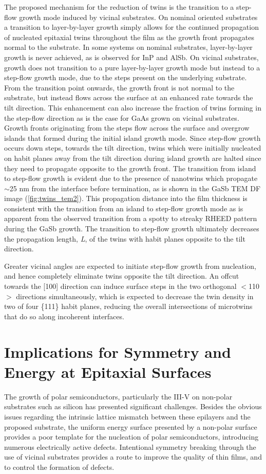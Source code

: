 The proposed mechanism for the reduction of twins is the transition to a step-flow growth mode induced by vicinal substrates. On nominal oriented substrates a transition to layer-by-layer growth simply allows for the continued propagation of nucleated epitaxial twins throughout the film as the growth front propagates normal to the substrate. In some systems on nominal substrates, layer-by-layer growth is never achieved, as is observed for InP and AlSb. On vicinal substrates, growth does not transition to a pure layer-by-layer growth mode but instead to a step-flow growth mode, due to the steps present on the underlying substrate. From the transition point onwards, the growth front is not normal to the substrate, but instead flows across the surface at an enhanced rate towards the tilt direction. This enhancement can also increase the fraction of twins forming in the step-flow direction as is the case for GaAs grown on vicinal substrates. Growth fronts originating from the steps flow across the surface and overgrow islands that formed during the initial island growth mode. Since step-flow growth occurs down steps, towards the tilt direction, twins which were initially nucleated on habit planes away from the tilt direction during island growth are halted since they need to propagate opposite to the growth front. The transition from island to step-flow growth is evident due to the presence of nanotwins which propagate $\sim$25 nm from the interface before termination, as is shown in the GaSb TEM DF image (\cref{fig:twins_tem2}). This propagation distance into the film thickness is consistent with the transition from an island to step-flow growth mode as is apparent from the observed transition from a spotty to streaky RHEED pattern during the GaSb growth. The transition to step-flow growth ultimately decreases the propagation length, \textit{L}, of the twins with habit planes opposite to the tilt direction. 

Greater vicinal angles are expected to initiate step-flow growth from nucleation, and hence completely eliminate twins opposite the tilt direction. An offcut towards the [100] direction can induce surface steps in the two orthogonal $<$110$>$ directions simultaneously\cite{Fang1990}, which is expected to decrease the twin density in two of four \{111\} habit planes, reducing the overall intersections of microtwins that do so along incoherent interfaces.
\section{Implications for Symmetry and Energy at Epitaxial Surfaces}
The growth of polar semiconductors, particularly the III-V on non-polar substrates such as silicon has presented significant challenges. Besides the obvious issues regarding the intrinsic lattice mismatch between these epilayers and the proposed substrate, the uniform energy surface presented by a non-polar surface provides a poor template for the nucleation of polar semiconductors, introducing numerous electrically active defects. Intentional symmetry breaking through the use of vicinal substrates provides a route to improve the quality of thin films, and to control the formation of defects.

